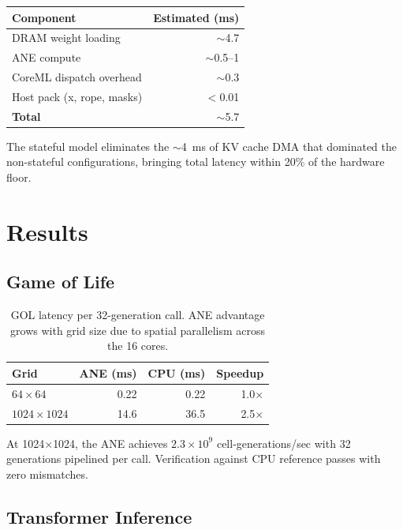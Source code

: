 \documentclass[11pt,twocolumn]{article}
\begin{document}
\begin{center}
\footnotesize
\begin{tabular}{lr}
\toprule
\textbf{Component} & \textbf{Estimated (ms)} \\
\midrule
DRAM weight loading & $\sim$4.7 \\
ANE compute & $\sim$0.5--1 \\
CoreML dispatch overhead & $\sim$0.3 \\
Host pack (x, rope, masks) & $<$0.01 \\
\midrule
\textbf{Total} & $\sim$5.7 \\
\bottomrule
\end{tabular}
\end{center}

The stateful model eliminates the $\sim$4~ms of KV cache DMA that
dominated the non-stateful configurations, bringing total latency
within 20\% of the hardware floor.


\section{Results}
\label{sec:results}

\subsection{Game of Life}

\begin{table}[t]
\centering
\footnotesize
\begin{tabular}{lrrr}
\toprule
\textbf{Grid} & \textbf{ANE (ms)} & \textbf{CPU (ms)} & \textbf{Speedup} \\
\midrule
$64 \times 64$ & 0.22 & 0.22 & 1.0$\times$ \\
$1024 \times 1024$ & 14.6 & 36.5 & 2.5$\times$ \\
\bottomrule
\end{tabular}
\caption{GOL latency per 32-generation call. ANE advantage grows with
grid size due to spatial parallelism across the 16 cores.}
\label{tab:gol}
\end{table}

At 1024$\times$1024, the ANE achieves $2.3 \times 10^9$
cell-generations/sec with 32 generations pipelined per call.
Verification against CPU reference passes with zero mismatches.

\subsection{Transformer Inference}
\end{document}
